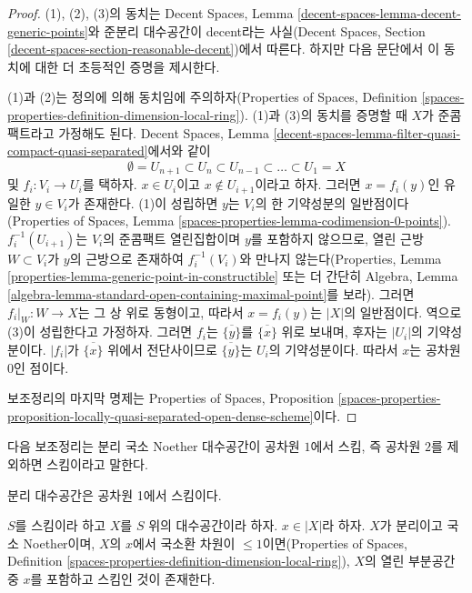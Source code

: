 \begin{proof}
(1), (2), (3)의 동치는 Decent Spaces, Lemma
\ref{decent-spaces-lemma-decent-generic-points}와 준분리 대수공간이
decent라는 사실(Decent Spaces, Section
\ref{decent-spaces-section-reasonable-decent})에서 따른다. 하지만 다음
문단에서 이 동치에 대한 더 초등적인 증명을 제시한다.

\medskip\noindent
(1)과 (2)는 정의에 의해 동치임에 주의하자(Properties of Spaces,
Definition \ref{spaces-properties-definition-dimension-local-ring}).
(1)과 (3)의 동치를 증명할 때 $X$가 준콤팩트라고 가정해도 된다.
Decent Spaces, Lemma
\ref{decent-spaces-lemma-filter-quasi-compact-quasi-separated}에서와 같이
$$
\emptyset = U_{n + 1} \subset
U_n \subset U_{n - 1} \subset \ldots \subset U_1 = X
$$
및 $f_i : V_i \to U_i$를 택하자. $x \in U_i$이고
$x \not \in U_{i + 1}$이라고 하자. 그러면 $x = f_i(y)$인 유일한
$y \in V_i$가 존재한다. (1)이 성립하면 $y$는 $V_i$의 한 기약성분의
일반점이다(Properties of Spaces, Lemma
\ref{spaces-properties-lemma-codimension-0-points}).
$f_i^{-1}(U_{i + 1})$는 $V_i$의 준콤팩트 열린집합이며 $y$를 포함하지
않으므로, 열린 근방 $W \subset V_i$가 $y$의 근방으로 존재하여
$f_i^{-1}(V_i)$와 만나지 않는다(Properties, Lemma
\ref{properties-lemma-generic-point-in-constructible} 또는 더 간단히
Algebra, Lemma
\ref{algebra-lemma-standard-open-containing-maximal-point}를 보라). 그러면
$f_i|_W : W \to X$는 그 상 위로 동형이고, 따라서 $x = f_i(y)$는
$|X|$의 일반점이다. 역으로 (3)이 성립한다고 가정하자. 그러면 $f_i$는
$\overline{\{y\}}$를 $\overline{\{x\}}$ 위로 보내며, 후자는
$|U_i|$의 기약성분이다.
$|f_i|$가 $\overline{\{x\}}$ 위에서 전단사이므로
$\overline{\{y\}}$는 $U_i$의 기약성분이다. 따라서 $x$는 공차원 $0$인
점이다.

\medskip\noindent
보조정리의 마지막 명제는 Properties of Spaces, Proposition
\ref{spaces-properties-proposition-locally-quasi-separated-open-dense-scheme}이다.
\end{proof}

\noindent
다음 보조정리는 분리 국소 Noether 대수공간이 공차원 $1$에서 스킴,
즉 공차원 $2$를 제외하면 스킴이라고 말한다.

\begin{lemma}
\label{lemma-codim-1-point-in-schematic-locus}
\begin{slogan}
분리 대수공간은 공차원 1에서 스킴이다.
\end{slogan}
$S$를 스킴이라 하고 $X$를 $S$ 위의 대수공간이라 하자. $x \in |X|$라
하자. $X$가 분리이고 국소 Noether이며, $X$의 $x$에서 국소환 차원이
$\leq 1$이면(Properties of Spaces, Definition
\ref{spaces-properties-definition-dimension-local-ring}), $X$의 열린
부분공간 중 $x$를 포함하고 스킴인 것이 존재한다.
\end{lemma}

